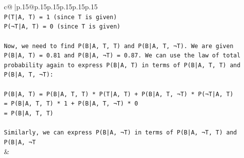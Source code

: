 \documentclass{article}
\begin{document}
{\begin{supertabular}{c@{$\;$}|p{.15\linewidth}@{}p{.15\linewidth}p{.15\linewidth}p{.15\linewidth}p{.15\linewidth}p{.15\linewidth}}
{{{\\ 
\texttt{P(T|A, T) = 1 (since T is given)} \\
\texttt{P(¬T|A, T) = 0 (since T is given)} \\
\\ 
\texttt{Now, we need to find P(B|A, T, T) and P(B|A, T, ¬T). We are given P(B|A, T) = 0.81 and P(B|A, ¬T) = 0.87. We can use the law of total probability again to express P(B|A, T) in terms of P(B|A, T, T) and P(B|A, T, ¬T):} \\
\\ 
\texttt{P(B|A, T) = P(B|A, T, T) * P(T|A, T) + P(B|A, T, ¬T) * P(¬T|A, T)} \\
\texttt{= P(B|A, T, T) * 1 + P(B|A, T, ¬T) * 0} \\
\texttt{= P(B|A, T, T)} \\
\\ 
\texttt{Similarly, we can express P(B|A, ¬T) in terms of P(B|A, ¬T, T) and P(B|A, ¬T} \\
            }
        }
    }
    & \\ \\


\end{supertabular}}
\end{document}
